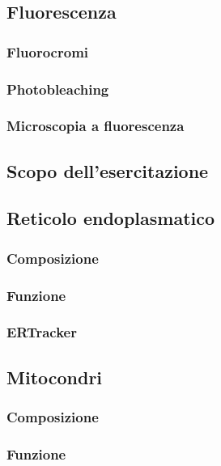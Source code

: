 	\subsection{Fluorescenza}

		\subsubsection{Fluorocromi}

		\subsubsection{Photobleaching}

		\subsubsection{Microscopia a fluorescenza}

	\subsection{Scopo dell'esercitazione}

	\subsection{Reticolo endoplasmatico}

		\subsubsection{Composizione}

		\subsubsection{Funzione}

		\subsubsection{ERTracker}

	\subsection{Mitocondri}

		\subsubsection{Composizione}

		\subsubsection{Funzione}

